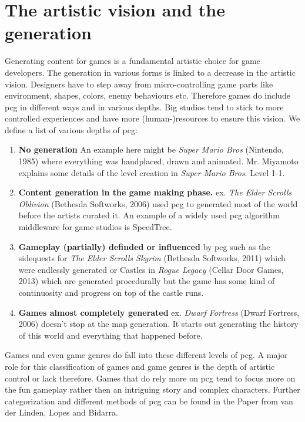 \documentclass[10pt,a4paper]{article}
\begin{document}
\section{The artistic vision and the generation}\label{sec:visionVSgeneration}
Generating content for games is a fundamental artistic choice for game developers. The generation in various forms is linked to a decrease in the artistic vision. Designers have to step away from micro-controlling game parts like environment, shapes, colors, enemy behaviours etc. Therefore games do include \gls{pcg} in different ways and in various depths. Big studios tend to stick to more controlled experiences and have more (human-)resources to ensure this vision. We define a list of various depths of \gls{pcg}:
\begin{enumerate}
\item \textbf{No generation} An example here might be \textit{Super Mario Bros} (Nintendo, 1985) where everything was handplaced, drawn and animated. Mr. Miyamoto explains some details of the level creation in \textit{Super Mario Bros}. Level 1-1\cite{EurogamerMiyamotoInterview}.
\item \textbf{Content generation in the game making phase.} ex. \textit{The Elder Scrolls Oblivion} (Bethesda Softworks, 2006) used \gls{pcg} to generated most of the world before the artists curated it\cite{PCGamerCarterInterview}. An example of a widely used \gls{pcg} algorithm middleware for game studios is SpeedTree\cite{SpeedTree}.
\item \textbf{Gameplay (partially) definded or influenced} by \gls{pcg} such as the sidequests for \textit{The Elder Scrolls Skyrim} (Bethesda Softworks, 2011) which were endlessly generated\cite{Bertz2011} or Castles in \textit{Rogue Legacy} (Cellar Door Games, 2013) which are generated procedurally but the game has some kind of continuosity and progress on top of the castle runs\cite{Stanton2013}.
\item \textbf{Games almost completely generated} ex. \textit{Dwarf Fortress} (Dwarf Fortress, 2006) doesn't stop at the map generation. It starts out generating the history of this world and everything that happened before\cite{Champandard2012}.
\end{enumerate}
Games and even game genres do fall into these different levels of \gls{pcg}. A major role for this classification of games and game genres is the depth of artistic control or lack therefore.\cite{VanderLinden2014} Games that do rely more on \gls{pcg} tend to focus more on the fun gameplay rather then an intriguing story and complex characters. Further categorization and different methods of \gls{pcg} can be found in the Paper from van der Linden, Lopes and Bidarra\cite{VanderLinden2014}.
\end{document}
